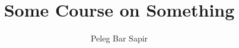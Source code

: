 \documentclass{article}
\title{Some Course on Something}
\author{Peleg Bar Sapir}
\begin{document}
\maketitle

\ifdefined\testcode
  
\else
\fi




\end{document}
